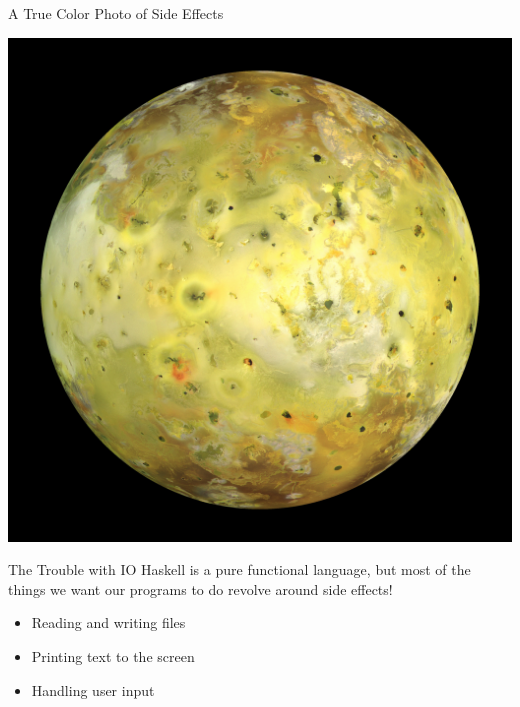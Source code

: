 \documentclass[10pt, presentation, colorlinks]{beamer}
\begin{document}
\begin{frame}[label={sec:org1b11d78}]{A True Color Photo of Side Effects}
\begin{center}
\includegraphics[height=0.6\textheight]{./img/io.jpg}
\end{center}
\end{frame}

\begin{frame}[label={sec:org9096779}]{The Trouble with IO}
Haskell is a \alert{pure functional} language, but most of the things we want our programs to do revolve around \alert{side effects}!

\bigskip

\pause
\begin{itemize}
\item Reading and writing files
\end{itemize}
\pause
\begin{itemize}
\item Printing text to the screen
\end{itemize}
\pause
\begin{itemize}
\item Handling user input
\end{itemize}
\end{frame}
\end{document}
